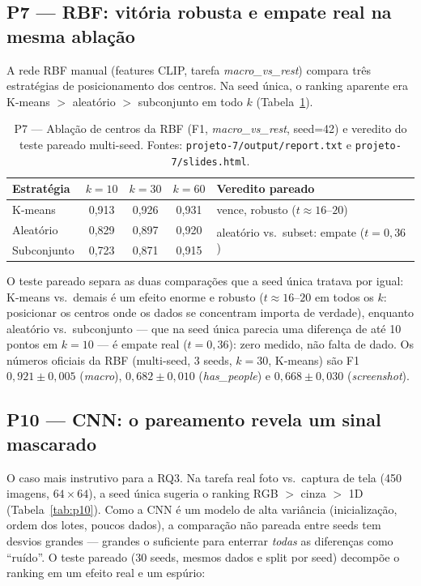 \documentclass[12pt]{article}
\begin{document}
\subsection{P7 --- RBF: vitória robusta e empate real na mesma ablação}
\label{sec:res-p7}

A rede RBF manual (features CLIP, tarefa \emph{macro\_vs\_rest}) compara três
estratégias de posicionamento dos centros. Na seed única, o ranking aparente
era K-means $>$ aleatório $>$ subconjunto em todo $k$
(Tabela~\ref{tab:p7}).

\begin{table}[htb]
\centering
\caption{P7 --- Ablação de centros da RBF (F1, \emph{macro\_vs\_rest},
seed=42) e veredito do teste pareado multi-seed. Fontes:
\texttt{projeto-7/output/report.txt} e \texttt{projeto-7/slides.html}.}
\label{tab:p7}
\begin{tabular}{lcccl}
\toprule
Estratégia & $k=10$ & $k=30$ & $k=60$ & Veredito pareado \\
\midrule
K-means     & 0{,}913 & 0{,}926 & 0{,}931 & vence, robusto
  ($t \approx 16$--$20$) \\
Aleatório   & 0{,}829 & 0{,}897 & 0{,}920 &
  \multirow{2}{*}{aleatório vs.\ subset: empate ($t = 0{,}36$)} \\
Subconjunto & 0{,}723 & 0{,}871 & 0{,}915 & \\
\bottomrule
\end{tabular}
\end{table}

O teste pareado separa as duas comparações que a seed única tratava por
igual: K-means vs.\ demais é um efeito enorme e robusto ($t \approx
16$--$20$ em todos os $k$: posicionar os centros onde os dados se concentram
importa de verdade), enquanto aleatório vs.\ subconjunto --- que na seed
única parecia uma diferença de até 10 pontos em $k=10$ --- é empate real
($t = 0{,}36$): zero medido, não falta de dado. Os números oficiais da RBF
(multi-seed, 3 seeds, $k=30$, K-means) são F1 $0{,}921 \pm 0{,}005$
(\emph{macro}), $0{,}682 \pm 0{,}010$ (\emph{has\_people}) e $0{,}668 \pm
0{,}030$ (\emph{screenshot}).

\subsection{P10 --- CNN: o pareamento revela um sinal mascarado}
\label{sec:res-p10}

O caso mais instrutivo para a RQ3. Na tarefa real foto vs.\ captura de tela
(450 imagens, $64 \times 64$), a seed única sugeria o ranking RGB $>$ cinza
$>$ 1D (Tabela~\ref{tab:p10}). Como a CNN é um modelo de alta variância
(inicialização, ordem dos lotes, poucos dados), a comparação não pareada
entre seeds tem desvios grandes --- grandes o suficiente para enterrar
\emph{todas} as diferenças como ``ruído''. O teste pareado (30 seeds, mesmos
dados e split por seed) decompõe o ranking em um efeito real e um espúrio:
\end{document}
